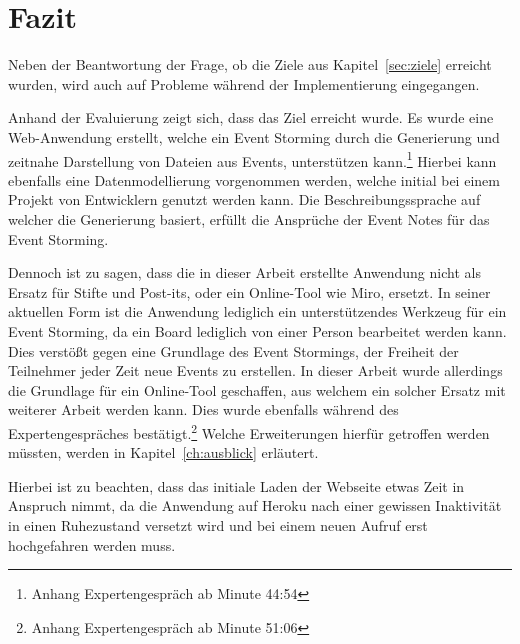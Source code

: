 \chapter{Fazit}\label{ch:fazit}
Neben der Beantwortung der Frage, ob die Ziele aus Kapitel~\ref{sec:ziele} erreicht wurden, wird auch auf Probleme während
der Implementierung eingegangen.

Anhand der Evaluierung zeigt sich, dass das Ziel erreicht wurde.
Es wurde eine Web-Anwendung erstellt, welche ein Event Storming durch die Generierung und zeitnahe Darstellung von Dateien aus Events, unterstützen kann.\footnote{Anhang Expertengespräch ab Minute 44:54}
Hierbei kann ebenfalls eine Datenmodellierung vorgenommen werden, welche initial bei einem Projekt von Entwicklern genutzt werden kann.
Die Beschreibungssprache auf welcher die Generierung basiert, erfüllt die Ansprüche der Event Notes für das Event Storming.

Dennoch ist zu sagen, dass die in dieser Arbeit erstellte Anwendung nicht als Ersatz für Stifte und Post-its, oder ein Online-Tool wie Miro, ersetzt.
In seiner aktuellen Form ist die Anwendung lediglich ein unterstützendes Werkzeug für ein Event Storming, da ein Board lediglich von einer Person bearbeitet werden kann.
Dies verstößt gegen eine Grundlage des Event Stormings, der Freiheit der Teilnehmer jeder Zeit neue Events zu erstellen.
In dieser Arbeit wurde allerdings die Grundlage für ein Online-Tool geschaffen, aus welchem ein solcher Ersatz mit weiterer Arbeit werden kann.
Dies wurde ebenfalls während des Expertengespräches bestätigt.\footnote{Anhang Expertengespräch ab Minute 51:06}
Welche Erweiterungen hierfür getroffen werden müssten, werden in Kapitel~\ref{ch:ausblick} erläutert.

Hierbei ist zu beachten, dass das initiale Laden der Webseite etwas Zeit in Anspruch nimmt, da die Anwendung auf Heroku nach einer gewissen
Inaktivität in einen Ruhezustand versetzt wird und bei einem neuen Aufruf erst hochgefahren werden muss.

